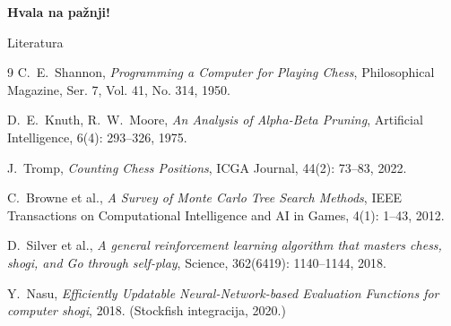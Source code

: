 \documentclass[aspectratio=43]{beamer}
\begin{document}
\begin{frame}
\centering
	\vfill
	{\Huge\textbf{Hvala na pažnji!}}
\end{frame}

\begin{frame}{Literatura}
\footnotesize
	\begin{thebibliography}{9}
		C.~E.~Shannon,
		\emph{Programming a Computer for Playing Chess},
		Philosophical Magazine, Ser. 7, Vol. 41, No. 314, 1950.
		
		D.~E.~Knuth, R.~W.~Moore,
		\emph{An Analysis of Alpha-Beta Pruning},
		Artificial Intelligence, 6(4): 293--326, 1975.
		
		J.~Tromp,
		\emph{Counting Chess Positions},
		ICGA Journal, 44(2): 73--83, 2022.
		
		C.~Browne et al.,
		\emph{A Survey of Monte Carlo Tree Search Methods},
		IEEE Transactions on Computational Intelligence and AI in Games, 4(1): 1--43, 2012.
		
		D.~Silver et al.,
		\emph{A general reinforcement learning algorithm that masters chess, shogi, and Go through self-play},
		Science, 362(6419): 1140--1144, 2018.
		
		Y.~Nasu,
		\emph{Efficiently Updatable Neural-Network-based Evaluation Functions for computer shogi},
		2018. (Stockfish integracija, 2020.)
	\end{thebibliography}

\end{frame}
\end{document}
